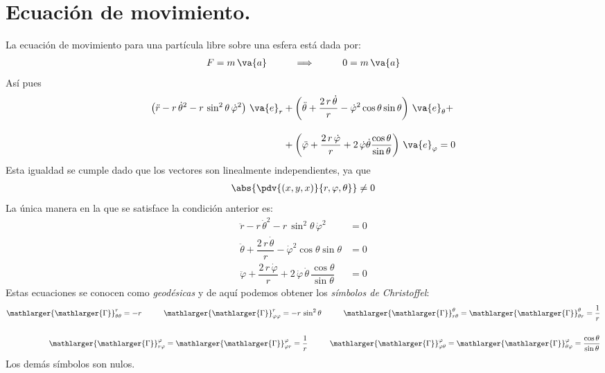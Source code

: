 \section{Ecuación de movimiento.}
La ecuación de movimiento para una partícula libre sobre una esfera está dada por:
\begin{align*}
F = m \, \va{a} \hspace{1cm} \Longrightarrow \hspace{1cm} 0 = m \, \va{a}
\end{align*}
Así pues
\begin{align*}
\left( \ddot{r} - r \, \dot{\theta}^{2} - r \, \sin^{2} \theta \, \dot{\varphi}^{2} \right) \, \va{e}_{r} &+ \left( \ddot{\theta} + \dfrac{2 \, r \, \dot{\theta}}{r} - \dot{\varphi}^{2} \cos \theta \sin \theta \right) \, \va{e}_{\theta} + \\[1em]
&+ \left( \ddot{\varphi} + \dfrac{2 \, r \, \dot{\varphi}}{r} + 2 \, \dot{\varphi} \dot{\theta} \dfrac{\cos \theta}{\sin \theta} \right) \, \va{e}_{\varphi} = 0
\end{align*}
Esta igualdad se cumple dado que los vectores son linealmente independientes, ya que
\begin{align*}
\abs{\pdv{(x, y, x)}{r, \varphi, \theta}} \neq 0
\end{align*}
La única manera en la que se satisface la condición anterior es:
\begin{align*}
\ddot{r} - r \, \dot{\theta}^{2} - r \, \sin^{2} \theta \, \dot{\varphi}^{2} &= 0 \\[1em]
\ddot{\theta} + \dfrac{2 \, r \, \dot{\theta}}{r} - \dot{\varphi}^{2} \cos \theta \sin \theta &= 0 \\[1em]
\ddot{\varphi} + \dfrac{2 \, r \, \dot{\varphi}}{r} + 2 \, \dot{\varphi} \, \dot{\theta} \, \dfrac{\cos \theta}{\sin \theta} &= 0
\end{align*}
Estas ecuaciones se conocen como \emph{geodésicas} y de aquí podemos obtener los \emph{símbolos de Christoffel}:
\begin{align*}
\mathlarger{\mathlarger{\Gamma}}_{\theta \theta}^{r} = - r \hspace{1cm} \mathlarger{\mathlarger{\Gamma}}_{\varphi \varphi}^{r} = - r \, \sin^{2} \theta \hspace{1cm} \mathlarger{\mathlarger{\Gamma}}_{r \theta}^{\theta} = \mathlarger{\mathlarger{\Gamma}}_{\theta r}^{\theta} = \dfrac{1}{r} \\[1.5em]
\mathlarger{\mathlarger{\Gamma}}_{r \varphi}^{\varphi} = \mathlarger{\mathlarger{\Gamma}}_{\varphi r}^{\varphi} = \dfrac{1}{r} \hspace{1cm} \mathlarger{\mathlarger{\Gamma}}_{\varphi \theta}^{\varphi} = \mathlarger{\mathlarger{\Gamma}}_{\theta \varphi}^{\varphi} = \dfrac{\cos \theta}{\sin \theta}
\end{align*}
Los demás símbolos son nulos.
